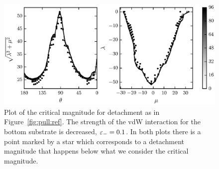    \begin{figure}[t]
      \begin{center}
         \includegraphics{./fig/ch3/pull/eb0.1/grid.eps}
      \end{center}      
      \caption{Plot of the critical magnitude for detachment as in Figure~\ref{fig:pull:ref}. The strength of the vdW interaction for the bottom substrate is decreased, $\varepsilon_-=0.1$. In both plots there is a point marked by a star which corresponds to a detachment magnitude that happens below what we consider the critical magnitude.
      \label{fig:pull:eb0.1}}
   \end{figure}

